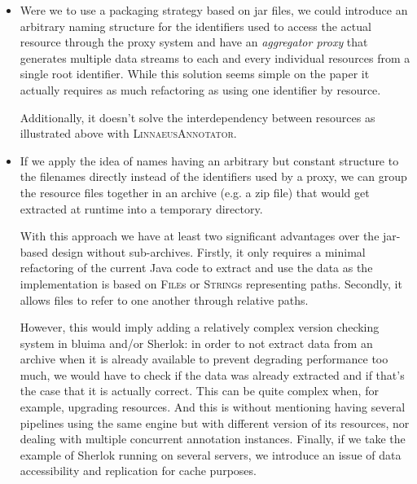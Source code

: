 \documentclass{article}
\newcommand{\ID}[1]{{\textsc{#1}}}
\begin{document}
\begin{itemize}

    \item Were we to use a packaging strategy based on jar files, we could introduce an arbitrary
        naming structure for the identifiers used to access the actual resource through the proxy
        system and have an \emph{aggregator proxy} that generates multiple data streams to each and
        every individual resources from a single root identifier. While this solution seems simple
        on the paper it actually requires as much refactoring as using one identifier by resource.

        Additionally, it doesn't solve the interdependency between resources as illustrated above
        with \ID{LinnaeusAnnotator}.

    \item If we apply the idea of names having an arbitrary but constant structure to the filenames
        directly instead of the identifiers used by a proxy, we can group the resource files
        together in an archive (e.g. a zip file) that would get extracted at runtime into a
        temporary directory.

        With this approach we have at least two significant advantages over the jar-based design
        without sub-archives. Firstly, it only requires a minimal refactoring of the current Java
        code to extract and use the data as the implementation is based on \ID{File}s or
        \ID{String}s representing paths. Secondly, it allows files to refer to one another through
        relative paths.

        However, this would imply adding a relatively complex version checking system in bluima
        and/or Sherlok: in order to not extract data from an archive when it is already available to
        prevent degrading performance too much, we would have to check if the data was already
        extracted and if that's the case that it is actually correct. This can be quite complex
        when, for example, upgrading resources. And this is without mentioning having several
        pipelines using the same engine but with different version of its resources, nor dealing
        with multiple concurrent annotation instances. Finally, if we take the example of Sherlok
        running on several servers, we introduce an issue of data accessibility and replication for
        cache purposes.

\end{itemize}
\end{document}
